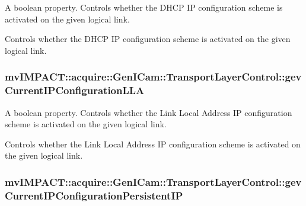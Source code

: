 A boolean property. Controls whether the D\+H\+C\+P I\+P configuration scheme is activated on the given logical link. 

Controls whether the D\+H\+C\+P I\+P configuration scheme is activated on the given logical link. \hypertarget{classmv_i_m_p_a_c_t_1_1acquire_1_1_gen_i_cam_1_1_transport_layer_control_a4303c3b2abd4b7a4f2ef1377666affb8}{
\subsubsection[{gev\+Current\+I\+P\+Configuration\+L\+L\+A}]{ mv\+I\+M\+P\+A\+C\+T\+::acquire\+::\+Gen\+I\+Cam\+::\+Transport\+Layer\+Control\+::gev\+Current\+I\+P\+Configuration\+L\+L\+A}}\label{classmv_i_m_p_a_c_t_1_1acquire_1_1_gen_i_cam_1_1_transport_layer_control_a4303c3b2abd4b7a4f2ef1377666affb8}


A boolean property. Controls whether the Link Local Address I\+P configuration scheme is activated on the given logical link. 

Controls whether the Link Local Address I\+P configuration scheme is activated on the given logical link. \hypertarget{classmv_i_m_p_a_c_t_1_1acquire_1_1_gen_i_cam_1_1_transport_layer_control_a20703ebd24b5979f0700526c85ab9422}{
\subsubsection[{gev\+Current\+I\+P\+Configuration\+Persistent\+I\+P}]{ mv\+I\+M\+P\+A\+C\+T\+::acquire\+::\+Gen\+I\+Cam\+::\+Transport\+Layer\+Control\+::gev\+Current\+I\+P\+Configuration\+Persistent\+I\+P}}\label{classmv_i_m_p_a_c_t_1_1acquire_1_1_gen_i_cam_1_1_transport_layer_control_a20703ebd24b5979f0700526c85ab9422}


